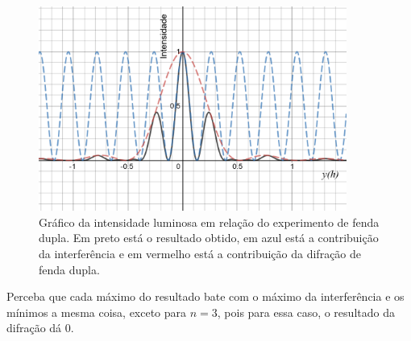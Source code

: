 \documentclass[12pt]{extarticle}
\newcommand{\<}{\langle}
\renewcommand{\>}{\rangle}
\theoremstyle{definition}
\begin{document}
\begin{figure}[H]
    \centering
    \includegraphics[width=0.9\textwidth]{padrao_inter_difracao.png}
    \caption{Gráfico da intensidade luminosa em relação do experimento de fenda dupla. Em preto está o resultado obtido, em azul está a contribuição da interferência e em vermelho está a contribuição da difração de fenda dupla.}
    \label{fig:resultado}
\end{figure}
Perceba que cada máximo do resultado bate com o máximo da interferência e os mínimos a mesma coisa, exceto para $n=3$, pois para essa caso, o resultado da difração dá 0.
\end{document}
